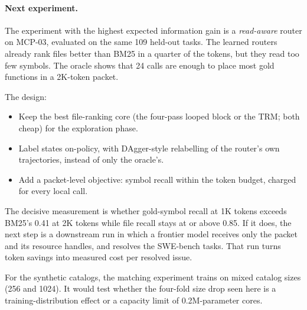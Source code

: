 \paragraph{Next experiment.} The experiment with the highest expected information gain is a \emph{read-aware} router on
MCP-03, evaluated on the same 109 held-out tasks. The learned routers already rank files better than BM25 in a quarter
of the tokens, but they read too few symbols. The oracle shows that 24 calls are enough to place most gold
functions in a 2K-token packet.

The design:
\begin{itemize}
\item Keep the best file-ranking core (the four-pass looped block or the TRM; both cheap) for the exploration phase.
\item Label states on-policy, with DAgger-style relabelling of the router's own trajectories, instead of only the oracle's.
\item Add a packet-level objective: symbol recall within the token budget, charged for every local call.
\end{itemize}

The decisive measurement is whether gold-symbol recall at 1K tokens exceeds BM25's 0.41 at 2K tokens while file
recall stays at or above 0.85. If it does, the next step is a downstream run in which a frontier model receives only
the packet and its resource handles, and resolves the SWE-bench tasks. That run turns token savings into measured
cost per resolved issue.

For the synthetic catalogs, the matching experiment trains on mixed catalog sizes (256 and 1024). It would test
whether the four-fold size drop seen here is a training-distribution effect or a capacity limit of 0.2M-parameter
cores.

